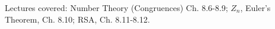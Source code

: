 \documentclass[handout]{mcs}
\begin{document}
\renewcommand{\reading}{ 
\begin{itemize}
\item Chapter~\bref{number_theory_chap}.\ \emph{Number Theory: Congruences}
  through~\bref{RSA_sec}.\ \emph{RSA Cryptosystem}.
\end{itemize}
}


\begin{staffnotes}
Lectures covered: Number Theory (Congruences) Ch. 8.6-8.9; $Z_n$,
Euler's Theorem, Ch. 8.10; RSA, Ch. 8.11-8.12.
\end{staffnotes}






\end{document}
